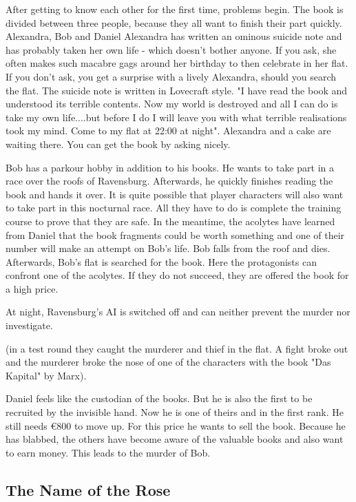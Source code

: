 After getting to know each other for the first time, problems begin. The book is divided between three people, because they all want to finish their part quickly. Alexandra, Bob and Daniel
Alexandra has written an ominous suicide note and has probably taken her own life - which doesn't bother anyone. If you ask, she often makes such macabre gags around her birthday to then celebrate in her flat. If you don't ask, you get a surprise with a lively Alexandra, should you search the flat.
The suicide note is written in Lovecraft style. "I have read the book and understood its terrible contents. Now my world is destroyed and all I can do is take my own life....but before I do I will leave you with what terrible realisations took my mind. Come to my flat at 22:00 at night".
Alexandra and a cake are waiting there. You can get the book by asking nicely.

Bob has a parkour hobby in addition to his books.  He wants to take part in a race over the roofs of Ravensburg. Afterwards, he quickly finishes reading the book and hands it over. It is quite possible that player characters will also want to take part in this nocturnal race. All they have to do is complete the training course to prove that they are safe.
In the meantime, the acolytes have learned from Daniel that the book fragments could be worth something and one of their number will make an attempt on Bob's life. Bob falls from the roof and dies. Afterwards, Bob's flat is searched for the book.
Here the protagonists can confront one of the acolytes. If they do not succeed, they are offered the book for a high price.

At night, Ravensburg's AI is switched off and can neither prevent the murder nor investigate.

(in a test round they caught the murderer and thief in the flat. A fight broke out and the murderer broke the nose of one of the characters with the book "Das Kapital" by Marx).

Daniel feels like the custodian of the books.  But he is also the first to be recruited by the invisible hand. Now he is one of theirs and in the first rank. He still needs €800 to move up. For this price he wants to sell the book. Because he has blabbed, the others have become aware of the valuable books and also want to earn money. This leads to the murder of Bob.


\subsection{The Name of the Rose}

